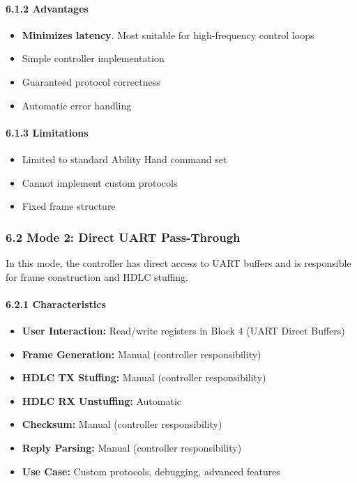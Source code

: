 \documentclass[
  11pt,
]{article}
\providecommand{\tightlist}{%
  \setlength{\itemsep}{0pt}\setlength{\parskip}{0pt}}
\begin{document}
\paragraph{6.1.2 Advantages}\label{advantages}

\begin{itemize}
\tightlist
\item
  \textbf{Minimizes latency}. Most suitable for high-frequency control
  loops
\item
  Simple controller implementation
\item
  Guaranteed protocol correctness
\item
  Automatic error handling
\end{itemize}

\paragraph{6.1.3 Limitations}\label{limitations}

\begin{itemize}
\tightlist
\item
  Limited to standard Ability Hand command set
\item
  Cannot implement custom protocols
\item
  Fixed frame structure
\end{itemize}

\subsubsection{6.2 Mode 2: Direct UART
Pass-Through}\label{mode-2-direct-uart-pass-through}

In this mode, the controller has direct access to UART buffers and is
responsible for frame construction and HDLC stuffing.

\paragraph{6.2.1 Characteristics}\label{characteristics-1}

\begin{itemize}
\tightlist
\item
  \textbf{User Interaction:} Read/write registers in Block 4 (UART
  Direct Buffers)
\item
  \textbf{Frame Generation:} Manual (controller responsibility)
\item
  \textbf{HDLC TX Stuffing:} Manual (controller responsibility)
\item
  \textbf{HDLC RX Unstuffing:} Automatic
\item
  \textbf{Checksum:} Manual (controller responsibility)
\item
  \textbf{Reply Parsing:} Manual (controller responsibility)
\item
  \textbf{Use Case:} Custom protocols, debugging, advanced features
\end{itemize}
\end{document}
